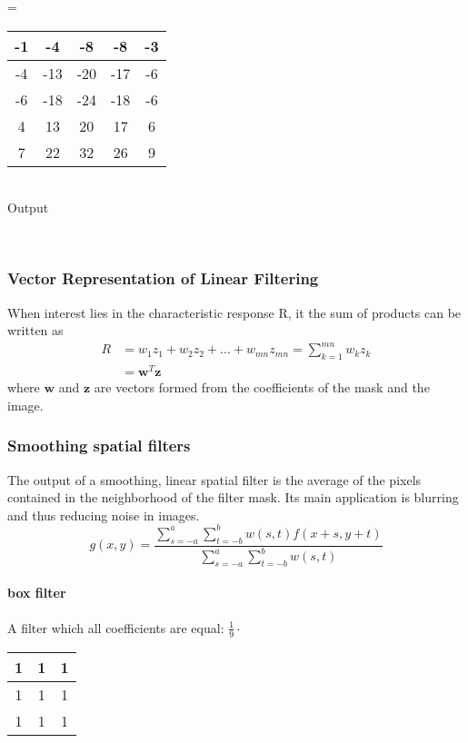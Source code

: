 	\begin{minipage}{0.3cm}
	\centering
		=
	\end{minipage}
	\begin{minipage}{2.3cm}
	\centering
		\begin{tabular}{|c|c|c|c|c|} \hline
			-1 & -4 & -8 & -8 & -3 \\\hline	
			-4 &-13 & -20 & -17 & -6 \\ \hline
	      	-6 &-18 & -24 & -18 & -6 \\ \hline
	      	4 & 13 & 20 & 17 & 6 \\ \hline
	      	7 & 22 & 32 & 26 & 9 \\ \hline
	      \end{tabular}\\
	      Output
	\end{minipage}
\\
	
\subsubsection{Vector Representation of Linear Filtering}
When interest lies in the characteristic response R, it the sum of products can be written as
\begin{align}
	R & = w_1z_1 + w_2z_2 + \dots + w_{mn}z_{mn} = \sum\limits_{k=1}^{mn}w_kz_k\\
	  & = \mathbf{w}^T\mathbf{z}
\end{align}
where $\mathbf{w}$ and $\mathbf{z}$ are vectors formed from the coefficients of the mask and the image.

\subsubsection{Smoothing spatial filters }
The output of a smoothing, linear spatial filter is the average of the pixels contained in the neighborhood of the filter mask.
Its main application is blurring and thus reducing noise in images.
\begin{equation}
g(x,y) = \frac{\sum\limits_{s=-a}^{a}\sum\limits_{t=-b}^{b}w(s,t) f(x+s, y+t)}{\sum\limits_{s=-a}^{a}\sum\limits_{t=-b}^{b}w(s,t)}
\end{equation}
\paragraph{box filter}
A filter which all coefficients are equal:
$ \frac{1}{9} \cdot$ \begin{tabular}{|c|c|c|} \hline 1 & 1 & 1 \\ \hline 1 & 1 & 1 \\ \hline 1 & 1 & 1  \\ \hline \end{tabular}
